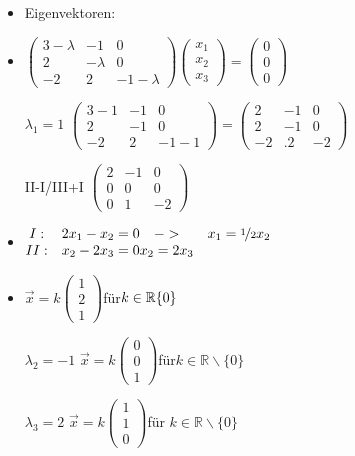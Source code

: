 \documentclass{article}
\newcommand{\R}{\mathbb{R}}
\begin{document}
\begin{itemize}
\begin{itemize}
\begin{itemize}
				\item{Eigenvektoren:}
				\item{$\begin{pmatrix} 3-\lambda & -1 & 0 \\ 2 & -\lambda & 0 \\ -2 & 2 & -1-\lambda \end{pmatrix}\begin{pmatrix} x_1 \\ x_2 \\ x_3 \end{pmatrix}=\begin{pmatrix} 0 \\ 0 \\ 0 \end{pmatrix}$}
				\item[$\lambda_1=1$]{$\begin{pmatrix} 3-1 & -1 & 0 \\ 2 & -1 & 0 \\ -2 & 2 & -1-1 \end{pmatrix}=\begin{pmatrix} 2 & -1 & 0 \\ 2 & -1 & 0 \\ -2 &.2 & -2 \end{pmatrix}$}
				\item[II-I/III+I]{$\begin{pmatrix} 2 & -1 & 0 \\ 0 & 0 & 0 \\ 0 & 1 & -2 \end{pmatrix}$}
				\item{$\begin{matrix} I: & 2x_1-x_2=0 \\ II: & x_2-2x_3=0 \end{matrix}\begin{matrix} -> & x_1=\nicefrac{1}{2}x_2 \\ x_2=2x_3 \end{matrix}$}
				\item{$\vec{x}=k \begin{pmatrix} 1 \\ 2 \\ 1 \end{pmatrix}$für$k\in\R\\\{0\}$}
				\item[$\lambda_2=-1$]{$\vec{x}=k \begin{pmatrix} 0 \\ 0 \\ 1 \end{pmatrix}$für$k\in\R\backslash\{0\}$}
				\item[$\lambda_3=2$]{$\vec{x}=k \begin{pmatrix} 1 \\ 1 \\ 0 \end{pmatrix}$für $k\in\R\backslash\{0\}$}
	\end{itemize}





\end{itemize}
\end{itemize}
\end{document}
